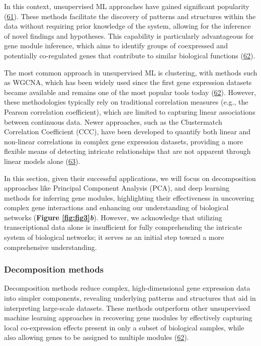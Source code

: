 In this context, unsupervised ML approaches have gained significant popularity (\protect\hyperlink{ref-Ko8gMp8P}{61}).
These methods facilitate the discovery of patterns and structures within the data without requiring prior knowledge of the system, allowing for the inference of novel findings and hypotheses.
This capability is particularly advantageous for gene module inference, which aims to identify groups of coexpressed and potentially co-regulated genes that contribute to similar biological functions (\protect\hyperlink{ref-1BVbSrr6M}{62}).

The most common approach in unsupervised ML is clustering, with methods such as WGCNA, which has been widely used since the first gene expression datasets became available and remains one of the most popular tools today (\protect\hyperlink{ref-1BVbSrr6M}{62}).
However, these methodologies typically rely on traditional correlation measures (e.g., the Pearson correlation coefficient), which are limited to capturing linear associations between continuous data.
Newer approaches, such as the Clustermatch Correlation Coefficient (CCC), have been developed to quantify both linear and non-linear correlations in complex gene expression datasets, providing a more flexible means of detecting intricate relationships that are not apparent through linear models alone (\protect\hyperlink{ref-YgLIM2bZ}{63}).

In this section, given their successful applications, we will focus on decomposition approaches like Principal Component Analysis (PCA), and deep learning methods for inferring gene modules, highlighting their effectiveness in uncovering complex gene interactions and enhancing our understanding of biological networks (\textbf{Figure \ref{fig:fig3}\emph{b}}).
However, we acknowledge that utilizing transcriptional data alone is insufficient for fully comprehending the intricate system of biological networks; it serves as an initial step toward a more comprehensive understanding.

\hypertarget{decomposition-methods}{%
\subsubsection{Decomposition methods}\label{decomposition-methods}}

Decomposition methods reduce complex, high-dimensional gene expression data into simpler components, revealing underlying patterns and structures that aid in interpreting large-scale datasets.
These methods outperform other unsupervised machine learning approaches in recovering gene modules by effectively capturing local co-expression effects present in only a subset of biological samples, while also allowing genes to be assigned to multiple modules (\protect\hyperlink{ref-1BVbSrr6M}{62}).

